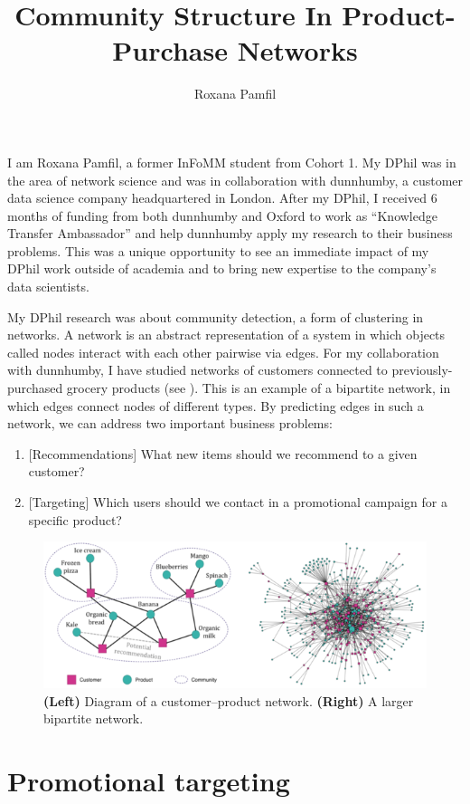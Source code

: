 \documentclass[a4paper, 10pt, english, oneside]{extarticle}
\author{Roxana Pamfil}
\title{Community Structure In Product-Purchase Networks}
\begin{document}
\maketitle %

I am Roxana Pamfil, a former InFoMM student from Cohort 1. My
DPhil was in the area of network science and was in collaboration
with dunnhumby, a customer data science company headquartered
in London. After my DPhil, I received 6 months of funding from both
dunnhumby and Oxford to work as ``Knowledge Transfer Ambassador''
and help dunnhumby apply my research to their business
problems. This was a unique opportunity to see an immediate impact
of my DPhil work outside of academia and to bring new expertise
to the company’s data scientists.

My DPhil research was about community detection, a form of clustering
in networks. A network is an abstract representation of a system
in which objects called nodes interact with each other pairwise
via edges. For my collaboration with dunnhumby, I have studied networks of customers connected
to previously-purchased grocery products (see ). This is an example of a bipartite network,
in which edges connect nodes of different types. By predicting edges in such a network, we can
address two important business problems:
\begin{enumerate}
\item {} [Recommendations] What new items should we recommend to a given customer?
\item {} [Targeting] Which users should we contact in a promotional campaign for a specific product?
\end{enumerate}


\begin{figure}
\includegraphics[width=0.7\linewidth]{network}
\caption{\textbf{(Left)} Diagram of a
customer–product
network.
\textbf{(Right)} A larger bipartite
network.}
\label{network}
\end{figure}

\section*{Promotional targeting}
\end{document}

